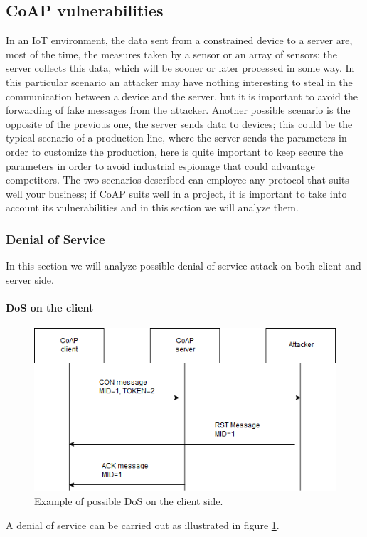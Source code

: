 	
	\subsection{CoAP vulnerabilities}
	In an IoT environment, the data sent from a constrained device to a server are, most of the time, the measures taken by a sensor or an array of sensors; the server collects this data, which will be sooner or later processed in some way.\newline
	In this particular scenario an attacker may have nothing interesting to steal in the communication between a device and the server, but it is important to avoid the forwarding of fake messages from the attacker.\newline
	Another possible scenario is the opposite of the previous one, the server sends data to devices; this could be the typical scenario of a production line, where the server sends the parameters in order to customize the production, here is quite important to keep secure the parameters in order to avoid industrial espionage that could advantage competitors.\newline
	The two scenarios described can employee any protocol that suits well your business; if CoAP suits well in a project, it is important to take into account its vulnerabilities and in this section we will analyze them.\newline
	
	\subsubsection{Denial of Service}
	In this section we will analyze possible denial of service attack on both client and server side.
	
	\paragraph{DoS on the client}
	\begin{figure}
		\includegraphics[width=\linewidth]{coap-vuln-img0.png}
		\caption{Example of possible DoS on the client side.}
		\label{fig:coap-vuln0}
	\end{figure}
	A denial of service can be carried out as illustrated in figure \ref{fig:coap-vuln0}.\newline
	
